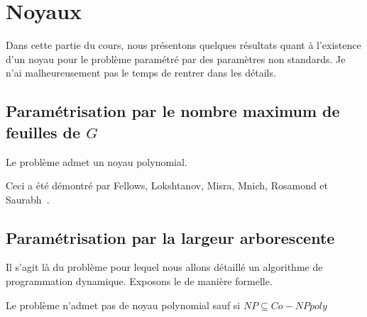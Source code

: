 \section{Noyaux}
\label{hcycle_kbounds}

Dans cette partie du cours, nous présentons quelques résultats quant à l'existence d'un noyau pour
le problème \hcycle paramétré par des paramètres non standards. Je n'ai malheureusement pas le temps
de rentrer dans les détails.

\subsection{Paramétrisation par le nombre maximum de feuilles de $G$}


\begin{nthrm}
    Le problème  admet un noyau polynomial.
\end{nthrm}

Ceci a été démontré par Fellows, Lokshtanov, Misra, Mnich, Rosamond et Saurabh~\cite{Fell09}.

\subsection{Paramétrisation par la largeur arborescente}

Il s'agit là du problème pour lequel nous allons détaillé un algorithme de programmation dynamique.
Exposons le de manière formelle.


\begin{nthrm}
    Le problème  n'admet pas de noyau polynomial sauf si $NP \subseteq Co-NPpoly$
\end{nthrm}


